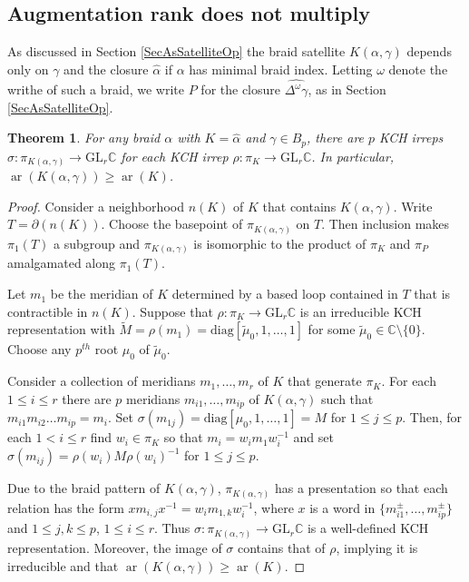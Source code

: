 \documentclass[11pt]{amsart}
\def\C{{\mathbb C}}
\def\s{{\sigma}}
\def\ar{\operatorname{ar}}
\newtheorem{thm}{Theorem}[section]
\theoremstyle{definition}
\begin{document}
\subsection{Augmentation rank does not multiply}
\label{SecMultiplic}

As discussed in Section \ref{SecAsSatelliteOp} the braid satellite $K(\alpha,\gamma)$ depends only on $\gamma$ and the closure $\hat{\alpha}$ if $\alpha$ has minimal braid index. Letting $\omega$ denote the writhe of such a braid, we write $P$ for the closure $\widehat{\Delta^\omega\gamma}$, as in Section \ref{SecAsSatelliteOp}.

\begin{thm}For any braid $\alpha$ with $K=\hat{\alpha}$ and $\gamma\in B_p$, there are $p$ KCH irreps $\s:\pi_{K(\alpha,\gamma)}\to\text{GL}_r\C$ for each KCH irrep $\rho:\pi_K\to\text{GL}_r\C$. In particular, $\ar(K(\alpha,\gamma)) \ge \ar(K)$.
\label{ThmCompanionRank}
\end{thm}
\begin{proof}Consider a neighborhood $n(K)$ of $K$ that contains $K(\alpha,\gamma)$. Write $T=\partial(n(K))$. Choose the basepoint of $\pi_{K(\alpha,\gamma)}$ on $T$. Then inclusion makes $\pi_1(T)$ a subgroup and $\pi_{K(\alpha,\gamma)}$ is isomorphic to the product of $\pi_K$ and $\pi_P$ amalgamated along $\pi_1(T)$.

Let $m_1$ be the meridian of $K$ determined by a based loop contained in $T$ that is contractible in $n(K)$. Suppose that $\rho:\pi_K\to\text{GL}_r\mathbb C$ is an irreducible KCH representation with $\widetilde M = \rho(m_1) = \text{diag}[\widetilde\mu_0,1,\ldots,1]$ for some $\widetilde\mu_0\in\mathbb C\setminus\{0\}$. Choose any $p^{th}$ root $\mu_0$ of $\widetilde\mu_0$. 

Consider a collection of meridians $m_1,\ldots,m_r$ of $K$ that generate $\pi_K$. For each $1\le i\le r$ there are $p$ meridians $m_{i1},\ldots,m_{ip}$ of $K(\alpha,\gamma)$ such that $m_{i1}m_{i2}\ldots m_{ip} = m_i$. Set $\s(m_{1j}) = \text{diag}[\mu_0,1,\ldots,1] = M$ for $1\le j\le p$. Then, for each $1< i\le r$ find $w_i\in\pi_K$ so that $m_i = w_im_1w_i^{-1}$ and set $\s(m_{ij}) = \rho(w_i)M\rho(w_i)^{-1}$ for $1\le j\le p$.

Due to the braid pattern of $K(\alpha,\gamma)$, $\pi_{K(\alpha,\gamma)}$ has a presentation so that each relation has the form $xm_{i,j}x^{-1} = w_im_{1,k}w_i^{-1}$, where $x$ is a word in $\{m_{i1}^{\pm},\ldots,m_{ip}^{\pm}\}$ and $1\le j, k\le p$, $1\le i\le r$. Thus $\s:\pi_{K(\alpha,\gamma)}\to\text{GL}_r\mathbb C$ is a well-defined KCH representation. Moreover, the image of $\s$ contains that of $\rho$, implying it is irreducible and that $\ar(K(\alpha,\gamma))\ge \ar(K)$.
\end{proof}
\end{document}
